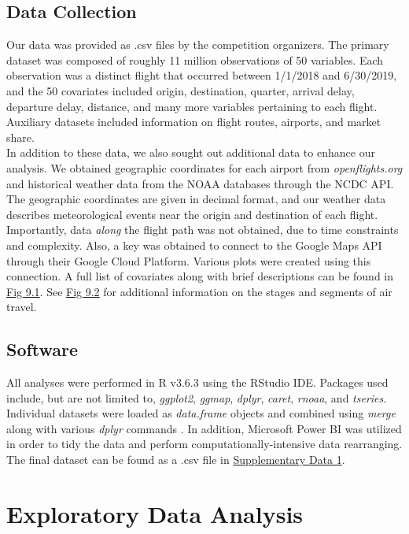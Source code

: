 \documentclass[12pt, a4paper, openany]{book}
\newcommand\tab[1][1cm]{\hspace*{#1}}
\begin{document}
	\section{Data Collection}
	\tab Our data was provided as .csv files by the competition organizers. The primary dataset was composed of roughly 11 million observations of 50 variables. Each observation was a distinct flight that occurred between 1/1/2018 and 6/30/2019, and the 50 covariates included origin, destination, quarter, arrival delay, departure delay, distance, and many more variables pertaining to each flight. Auxiliary datasets included information on flight routes, airports, and market share. \\
	\tab In addition to these data, we also sought out additional data to enhance our analysis. We obtained geographic coordinates for each airport from \textit{openflights.org} and historical weather data from the NOAA databases through the NCDC API. The geographic coordinates are given in decimal format, and our weather data describes meteorological events near the origin and destination of each flight. Importantly, data \textit{along} the flight path was not obtained, due to time constraints and complexity. Also, a key was obtained to connect to the Google Maps API through their Google Cloud Platform. Various plots were created using this connection. A full list of covariates along with brief descriptions can be found in \underline{Fig 9.1}. See \underline{Fig 9.2} for additional information on the stages and segments of air travel.
	\section{Software}
	\tab All analyses were performed in R v3.6.3 using the RStudio IDE. Packages used include, but are not limited to, \textit{ggplot2}, \textit{ggmap}, \textit{dplyr}, \textit{caret}, \textit{rnoaa}, and \textit{tseries}. Individual datasets were loaded as \textit{data.frame} objects and combined using \textit{merge} along with various \textit{dplyr} commands . In addition, Microsoft Power BI was utilized in order to tidy the data and perform computationally-intensive data rearranging. The final dataset can be found as a .csv file in \underline{Supplementary Data 1}.

\chapter{Exploratory Data Analysis}
\end{document}
